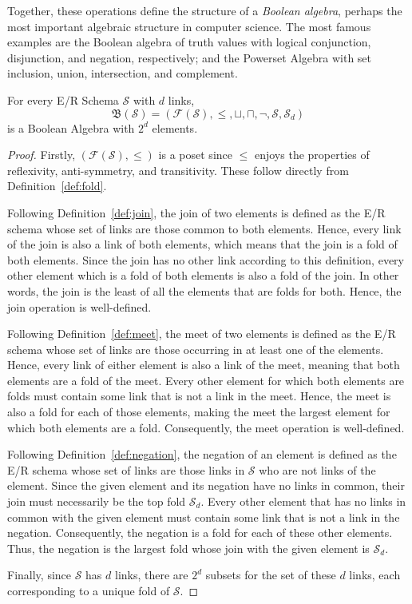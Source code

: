 \documentclass[sigconf]{acmart}
\begin{document}
Together, these operations define the structure of a \textit{Boolean algebra}, perhaps the most important algebraic structure in computer science. The most famous examples are the Boolean algebra of truth values with logical conjunction, disjunction, and negation, respectively; and the Powerset Algebra with set inclusion, union, intersection, and complement.

\begin{theorem}\label{thm:boolean} For every E/R Schema $\mathcal{S}$ with $d$ links,
\[\mathfrak{B}(\mathcal{S})=(\mathcal{F}(\mathcal{S}),\le,\sqcup,\sqcap,\neg,\mathcal{S},\mathcal{S}_d)\] is a Boolean Algebra with $2^d$ elements.
\end{theorem}

\begin{proof} Firstly, $(\mathcal{F}(\mathcal{S}),\le)$ is a poset since $\le$ enjoys the properties of reflexivity, anti-symmetry, and transitivity. These follow directly from Definition~\ref{def:fold}.

Following Definition~\ref{def:join}, the join of two elements is defined as the E/R schema whose set of links are those common to both elements. Hence, every link of the join is also a link of both elements, which means that the join is a fold of both elements. Since the join has no other link according to this definition, every other element which is a fold of both elements is also a fold of the join. In other words, the join is the least of all the elements that are folds for both. Hence, the join operation is well-defined.

Following Definition~\ref{def:meet}, the meet of two elements is defined as the E/R schema whose set of links are those occurring in at least one of the elements. Hence, every link of either element is also a link of the meet, meaning that both elements are a fold of the meet. Every other element for which both elements are folds must contain some link that is not a link in the meet. Hence, the meet is also a fold for each of those elements, making the meet the largest element for which both elements are a fold. Consequently, the meet operation is well-defined.

Following Definition~\ref{def:negation}, the negation of an element is defined as the E/R schema whose set of links are those links in $\mathcal{S}$ who are not links of the element. Since the given element and its negation have no links in common, their join must necessarily be the top fold $\mathcal{S}_d$. Every other element that has no links in common with the given element must contain some link that is not a link in the negation. Consequently, the negation is a fold for each of these other elements. Thus, the negation is the largest fold whose join with the given element is $\mathcal{S}_d$.

Finally, since $\mathcal{S}$ has $d$ links, there are $2^d$ subsets for the set of these $d$ links, each corresponding to a unique fold of $\mathcal{S}$.
\end{proof}
\end{document}
